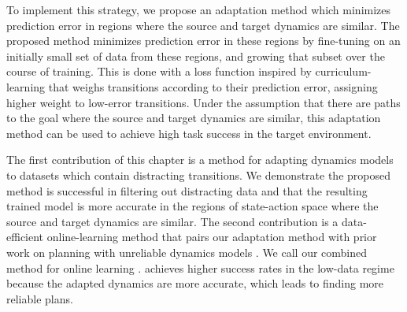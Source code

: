To implement this strategy, we propose an adaptation method which minimizes prediction error in regions where the source and target dynamics are similar. The proposed method minimizes prediction error in these regions by fine-tuning on an initially small set of data from these regions, and growing that subset over the course of training. This is done with a loss function inspired by curriculum-learning that weighs transitions according to their prediction error, assigning higher weight to low-error transitions. Under the assumption that there are paths to the goal where the source and target dynamics are similar, this adaptation method can be used to achieve high task success in the target environment.

The first contribution of this chapter is a method for adapting dynamics models to datasets which contain distracting transitions. We demonstrate the proposed method is successful in filtering out distracting data and that the resulting trained model is more accurate in the regions of state-action space where the source and target dynamics are similar. The second contribution is a data-efficient online-learning method that pairs our adaptation method with prior work on planning with unreliable dynamics models \cite{UnreliableMitrano2021,MDEs22}. We call our combined method for online learning \FOCUS{}. \FOCUS{} achieves higher success rates in the low-data regime because the adapted dynamics are more accurate, which leads to finding more reliable plans.